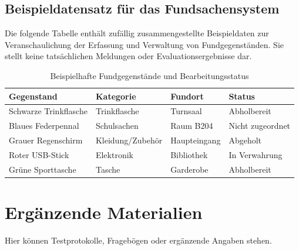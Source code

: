 \section{Beispieldatensatz für das Fundsachensystem}
Die folgende Tabelle enthält zufällig zusammengestellte Beispieldaten zur
Veranschaulichung der Erfassung und Verwaltung von Fundgegenständen. Sie stellt
keine tatsächlichen Meldungen oder Evaluationsergebnisse dar.

\begin{table}[htbp]
    \centering
    \caption{Beispielhafte Fundgegenstände und Bearbeitungsstatus}
    \label{tab:fundgegenstaende-beispiel}
    \begin{tabular}{llll}
        \toprule
        Gegenstand & Kategorie & Fundort & Status \\
        \midrule
        Schwarze Trinkflasche & Trinkflasche & Turnsaal & Abholbereit \\
        Blaues Federpennal & Schulsachen & Raum B204 & Nicht zugeordnet \\
        Grauer Regenschirm & Kleidung/Zubehör & Haupteingang & Abgeholt \\
        Roter USB-Stick & Elektronik & Bibliothek & In Verwahrung \\
        Grüne Sporttasche & Tasche & Garderobe & Abholbereit \\
        \bottomrule
    \end{tabular}
\end{table}
\chapter{Ergänzende Materialien}
Hier können Testprotokolle, Fragebögen oder ergänzende Angaben stehen.
